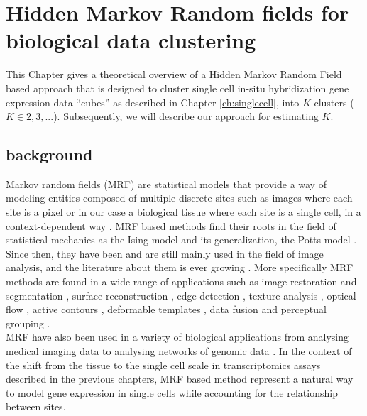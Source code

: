 \chapter{Hidden Markov Random fields for biological data clustering}\label{ch:HMRF} 
This Chapter gives a theoretical overview of a Hidden Markov Random Field based approach that is designed to cluster single cell in-situ hybridization gene expression data ``cubes'' as described in Chapter \ref{ch:singlecell}, into $K$ clusters ($K \in {2, 3,...}$). Subsequently, we will describe our approach for estimating $K$.

	\section{background}
	Markov random fields (MRF) are statistical models that provide a way of modeling entities composed of multiple discrete sites such as images where each site is a pixel or in our case a biological tissue where each site is a single cell, in a context-dependent way \cite{li09}. MRF based methods find their roots in the field of statistical mechanics as the Ising model \cite{Ising25} and its generalization, the Potts model \cite{Wu82}. Since then, they have been and are still mainly used in the field of image analysis, and the literature about them is ever growing \cite{rozanov82,li95}. More specifically MRF methods are found in a wide range of applications such as image restoration and segmentation \cite{zhang01}, surface reconstruction \cite{paulsen10}, edge detection \cite{zerubia93}, texture analysis \cite{clausi04}, optical flow \cite{heitz93}, active contours \cite{martin05}, deformable templates \cite{mignotte01}, data fusion \cite{wright89} and perceptual grouping \cite{fields97}.\\
	
	MRF have also been used in a variety of biological applications from analysing medical imaging data \cite{zhang01,held97,descombes98} to analysing networks of genomic data \cite{wei07}. In the context of the shift from the tissue to the single cell scale in transcriptomics assays described in the previous chapters, MRF based method represent a natural way to model gene expression in single cells while accounting for the relationship between sites.\\
	

